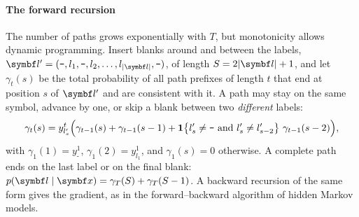 \documentclass[11pt]{article}
\newcommand{\blank}{\texttt{-}}
\begin{document}
\paragraph{The forward recursion} The number of paths grows exponentially with $T$, but monotonicity allows dynamic
programming. Insert blanks around and between the labels, $\vect{l}' = (\blank, l_1, \blank, l_2, \dots, l_{|\vect{l}|},
\blank)$, of length $S = 2|\vect{l}| + 1$, and let $\gamma_t(s)$ be the total probability of all path prefixes of length $t$
that end at position $s$ of $\vect{l}'$ and are consistent with it. A path may stay on the same symbol, advance by one, or
skip a blank between two \emph{different} labels:
\begin{equation}\label{eq:ctcfwd}
  \gamma_t(s) = y^t_{l'_s}\Big(\gamma_{t-1}(s) + \gamma_{t-1}(s - 1) + \ind{l'_s \ne \blank \text{ and } l'_s \ne l'_{s-2}}\,\gamma_{t-1}(s - 2)\Big),
\end{equation}
with $\gamma_1(1) = y^1_{\blank}$, $\gamma_1(2) = y^1_{l_1}$, and $\gamma_1(s) = 0$ otherwise. A complete path ends on the last
label or on the final blank: $p(\vect{l} \mid \x) = \gamma_T(S) + \gamma_T(S - 1)$. A backward recursion of the same form
gives the gradient, as in the forward--backward algorithm of hidden Markov models.
\end{document}
